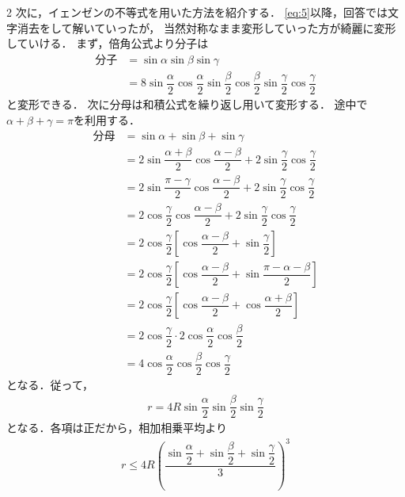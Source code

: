 \documentclass[../../main.tex]{subfiles}
\begin{document}
\begin{multicols}{2}
  次に，イェンゼンの不等式を用いた方法を紹介する．
  \cref{eq:5}以降，回答では文字消去をして解いていったが，
  当然対称なまま変形していった方が綺麗に変形していける．
  まず，倍角公式より分子は
  \begin{align}
    \text{分子}
    & =\sin\alpha\sin\beta\sin\gamma                                                                                            \\
    & = 8\sin\dfrac{\alpha}{2}\cos\dfrac{\alpha}{2}\sin\dfrac{\beta}{2}\cos\dfrac{\beta}{2}\sin\dfrac{\gamma}{2}\cos\dfrac{\gamma}{2}
  \end{align}
  と変形できる．
  次に分母は和積公式を繰り返し用いて変形する．
  途中で$\alpha+\beta+\gamma=\pi$を利用する．
  \begin{align}
    \text{分母}
    & = \sin \alpha + \sin \beta + \sin \gamma                                                            \\
    & = 2\sin\dfrac{\alpha+\beta}{2}\cos\dfrac{\alpha-\beta}{2} + 2\sin\dfrac{\gamma}{2}\cos\dfrac{\gamma}{2} \\
    & = 2\sin\dfrac{\pi-\gamma}{2}\cos\dfrac{\alpha-\beta}{2} + 2\sin\dfrac{\gamma}{2}\cos\dfrac{\gamma}{2}   \\
    & = 2\cos\dfrac{\gamma}{2}\cos\dfrac{\alpha-\beta}{2} + 2\sin\dfrac{\gamma}{2}\cos\dfrac{\gamma}{2}       \\
    & = 2\cos\dfrac{\gamma}{2}\left[\cos\dfrac{\alpha-\beta}{2} + \sin\dfrac{\gamma}{2}\right]               \\
    & = 2\cos\dfrac{\gamma}{2}\left[\cos\dfrac{\alpha-\beta}{2} + \sin\dfrac{\pi-\alpha-\beta}{2}\right]     \\
    & = 2\cos\dfrac{\gamma}{2}\left[\cos\dfrac{\alpha-\beta}{2} + \cos\dfrac{\alpha+\beta}{2}\right]         \\
    & = 2\cos\dfrac{\gamma}{2}\cdot 2\cos\dfrac{\alpha}{2}\cos\dfrac{\beta}{2}                               \\
    & = 4\cos\dfrac{\alpha}{2}\cos\dfrac{\beta}{2}\cos\dfrac{\gamma}{2}
  \end{align}
  となる．従って，
  \begin{align}
    r = 4R\sin\dfrac{\alpha}{2}\sin\dfrac{\beta}{2}\sin\dfrac{\gamma}{2}
  \end{align}
  となる．各項は正だから，相加相乗平均より
  \begin{align}
    r \le 4R \left(\dfrac{\sin\dfrac{\alpha}{2}+\sin\dfrac{\beta}{2}+\sin\dfrac{\gamma}{2}}{3}\right)^3
  \end{align}

\end{multicols}
\end{document}
